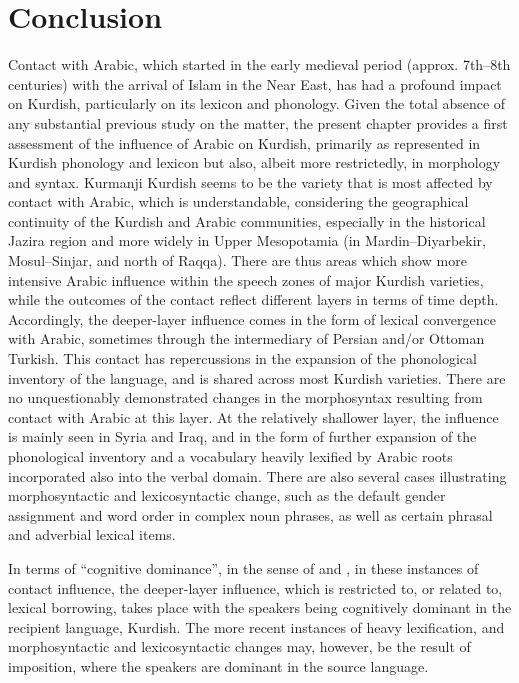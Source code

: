 \documentclass[output=paper]{langsci/langscibook}
\begin{document}
\section{Conclusion}
Contact with Arabic, which started in the early medieval period (approx. 7th–8th centuries) with the arrival of Islam in the Near East, has had a profound impact on Kurdish, particularly on its lexicon and phonology. Given the total absence of any substantial previous study on the matter, the present chapter provides a first assessment of the influence of Arabic on Kurdish, primarily as represented in Kurdish phonology and lexicon but also, albeit more restrictedly, in morphology and syntax. Kurmanji Kurdish seems to be the variety that is most affected by contact with Arabic, which is understandable, considering the geographical continuity of the Kurdish and Arabic communities, especially in the historical Jazira region and more widely in Upper Mesopotamia (in Mardin–Diyarbekir, Mosul–Sinjar, and north of Raqqa). There are thus areas which show more intensive Arabic influence within the speech zones of major Kurdish varieties, while the outcomes of the contact reflect different layers in terms of time depth. Accordingly, the deeper-layer influence comes in the form of lexical convergence with Arabic, sometimes through the intermediary of Persian and/or Ottoman Turkish. This contact has repercussions in the expansion of the phonological inventory of the language, and is shared across most Kurdish varieties. There are no unquestionably demonstrated changes in the morphosyntax resulting from contact with Arabic at this layer. At the relatively shallower layer, the influence is mainly seen in Syria and Iraq, and in the form of further expansion of the phonological inventory and a vocabulary heavily lexified by Arabic roots incorporated also into the verbal domain. There are also several cases illustrating morphosyntactic and lexicosyntactic change, such as the default gender assignment and word order in complex noun phrases, as well as certain phrasal and adverbial lexical items. 

In terms of “cognitive dominance”, in the sense of \citet{VanCoetsem1988,VanCoetsem2000} and \citet{Lucas2015}, in these instances of contact influence, the deeper-layer influence, which is restricted to, or related to, lexical borrowing, takes place with the speakers being cognitively dominant in the recipient language, Kurdish. The more recent instances of heavy lexification, and morphosyntactic and lexicosyntactic changes may, however, be the result of imposition, where the speakers are dominant in the source language. 
\end{document}
